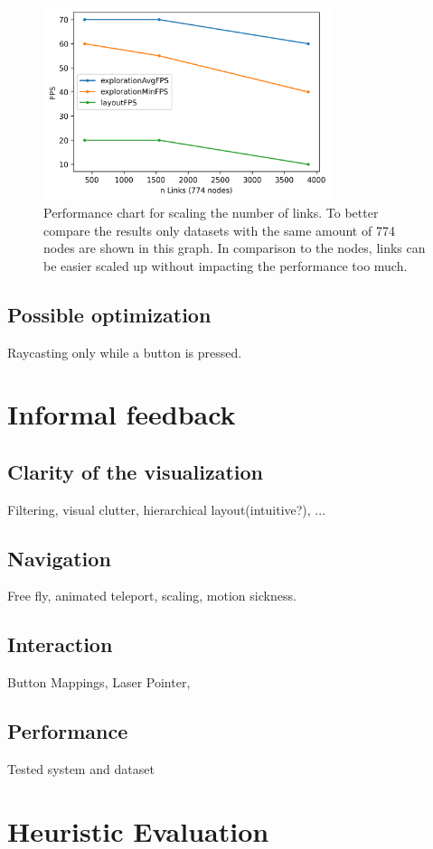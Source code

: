 \begin{figure}[!hbt]
    \centering
    \includegraphics[width=0.75\textwidth]{graphics/performanceAnalysisLinks.png}
    \caption{Performance chart for scaling the number of links. To better compare the results only datasets with the same amount of 774 nodes are shown in this graph. In comparison to the nodes, links can be easier scaled up without impacting the performance too much.} 
    \label{fig:performanceLinks} 
\end{figure}

\subsection{Possible optimization}

Raycasting only while a button is pressed. 

\section{Informal feedback}
\label{sec:informalFeedback}

\subsection{Clarity of the visualization}
Filtering, visual clutter, hierarchical layout(intuitive?), ...

\subsection{Navigation}
Free fly, animated teleport, scaling, motion sickness.

\subsection{Interaction}
Button Mappings, Laser Pointer, 

\subsection{Performance}
Tested system and dataset

\section{Heuristic Evaluation}
\label{sec:heuristicEvaluation}